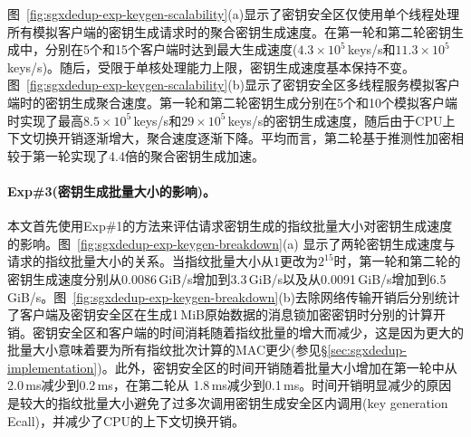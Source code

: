 图~\ref{fig:sgxdedup-exp-keygen-scalability}(a)显示了密钥安全区仅使用单个线程处理所有模拟客户端的密钥生成请求时的聚合密钥生成速度。在第一轮和第二轮密钥生成中，\sysnameS 分别在5个和15个客户端时达到最大生成速度($4.3\times 10^5$\,keys/s和$11.3\times 10^5$\,keys/s)。随后，受限于单核处理能力上限，密钥生成速度基本保持不变。图~\ref{fig:sgxdedup-exp-keygen-scalability}(b)显示了密钥安全区多线程服务模拟客户端时的密钥生成聚合速度。第一轮和第二轮密钥生成分别在5个和10个模拟客户端时实现了最高$8.5\times 10^5$\,keys/s和$29\times 10^5$\,keys/s的密钥生成速度，随后由于CPU上下文切换开销逐渐增大，聚合速度逐渐下降。平均而言，第二轮基于推测性加密相较于第一轮实现了4.4倍的聚合密钥生成加速。

\paragraph*{Exp\#3(密钥生成批量大小的影响)。}

本文首先使用Exp\#1的方法来评估请求密钥生成的指纹批量大小对密钥生成速度的影响。图~\ref{fig:sgxdedup-exp-keygen-breakdown}(a) 显示了两轮密钥生成速度与请求的指纹批量大小的关系。当指纹批量大小从$1$更改为$2^{15}$时，第一轮和第二轮的密钥生成速度分别从0.0086\,GiB/s增加到3.3\,GiB/s以及从0.0091\,GiB/s增加到6.5\,GiB/s。图~\ref{fig:sgxdedup-exp-keygen-breakdown}(b)去除网络传输开销后分别统计了客户端及密钥安全区在生成1\,MiB原始数据的消息锁加密密钥时分别的计算开销。密钥安全区和客户端的时间消耗随着指纹批量的增大而减少，这是因为更大的批量大小意味着要为所有指纹批次计算的MAC更少(参见\S\ref{sec:sgxdedup-implementation})。此外，密钥安全区的时间开销随着批量大小增加在第一轮中从2.0\,ms减少到0.2\,ms，在第二轮从 1.8\,ms减少到0.1\,ms。时间开销明显减少的原因是较大的指纹批量大小避免了过多次调用密钥生成安全区内调用(key generation Ecall)，并减少了CPU的上下文切换开销。


